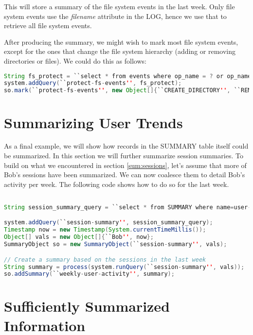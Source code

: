 \noindent
This will store a summary of the file system events in the last week. Only file system events use the \emph{filename} attribute in the LOG, hence we use that to retrieve all file system events.

After producing the summary, we might wish to mark most file system events, except for the ones that change the file system hierarchy (adding or removing directories or files). We could do this as follows:

\begin{lstlisting}[language=Java]
String fs_protect = ``select * from events where op_name = ? or op_name = ?''
system.addQuery(``protect-fs-events'', fs_protect);
so.mark(``protect-fs-events'', new Object[]{``CREATE_DIRECTORY'', ``REMOVE_DIRECTORY'', ``CREATE_FILE, ``REMOVE_FILE''});
\end{lstlisting}

\section{Summarizing User Trends}

As a final example, we will show how records in the SUMMARY table itself could be summarized. In this section we will further summarize session summaries. To build on what we encountered in section \ref{sum:sessions}, let's assume that more of Bob's sessions have been summarized. We can now coalesce them to detail Bob's activity per week. The following code shows how to do so for the last week.

\begin{lstlisting}[language=Java]

String session_summary_query = ``select * from SUMMARY where name=user-session-summary and to_array(args)[0]=? to_array(args)[3]::timestamp > DATE_SUB(?, INTERVAL 7 DAY) and to_array(args)[3]::timestamp < DATE_SUB(?, INTERVAL 14 DAY)';

system.addQuery(``session-summary'', session_summary_query);
Timestamp now = new Timestamp(System.currentTimeMillis());
Object[] vals = new Object[]{``Bob'', now};
SummaryObject so = new SummaryObject(``session-summary'', vals);

// Create a summary based on the sessions in the last week
String summary = process(system.runQuery(``session-summary'', vals));
so.addSummary(``weekly-user-activity'', summary);
\end{lstlisting}


\section{Sufficiently Summarized Information}

